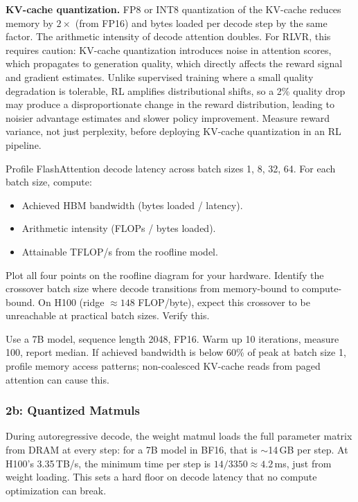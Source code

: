 \textbf{KV-cache quantization.} FP8 or INT8 quantization of the KV-cache reduces memory by $2\times$ (from FP16) and bytes loaded per decode step by the same factor. The arithmetic intensity of decode attention doubles. For RLVR, this requires caution: KV-cache quantization introduces noise in attention scores, which propagates to generation quality, which directly affects the reward signal and gradient estimates. Unlike supervised training where a small quality degradation is tolerable, RL amplifies distributional shifts, so a 2\% quality drop may produce a disproportionate change in the reward distribution, leading to noisier advantage estimates and slower policy improvement. Measure reward variance, not just perplexity, before deploying KV-cache quantization in an RL pipeline.

\begin{exercise}
Profile FlashAttention decode latency across batch sizes 1, 8, 32, 64. For each batch size, compute:
\begin{itemize}
  \item Achieved HBM bandwidth (bytes loaded / latency).
  \item Arithmetic intensity (FLOPs / bytes loaded).
  \item Attainable TFLOP/s from the roofline model.
\end{itemize}

Plot all four points on the roofline diagram for your hardware. Identify the crossover batch size where decode transitions from memory-bound to compute-bound. On H100 (ridge $\approx 148$ FLOP/byte), expect this crossover to be unreachable at practical batch sizes. Verify this.

Use a 7B model, sequence length 2048, FP16. Warm up 10 iterations, measure 100, report median. If achieved bandwidth is below 60\% of peak at batch size 1, profile memory access patterns; non-coalesced KV-cache reads from paged attention can cause this.
\end{exercise}

\subsubsection*{2b: Quantized Matmuls}

During autoregressive decode, the weight matmul loads the full parameter matrix from DRAM at every step: for a 7B model in BF16, that is $\sim$14\,GB per step. At H100's 3.35\,TB/s, the minimum time per step is $14 / 3350 \approx 4.2$\,ms, just from weight loading. This sets a hard floor on decode latency that no compute optimization can break.


